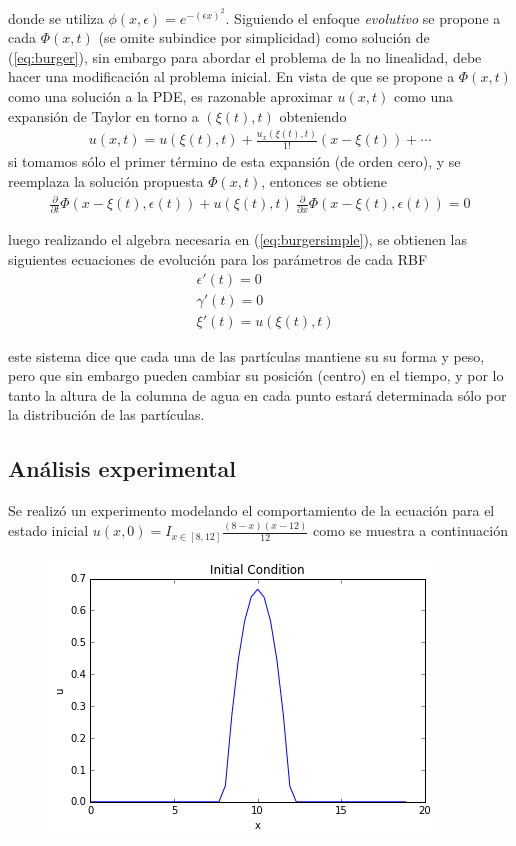 \documentclass[spanish]{article}
\begin{document}
    \noindent donde se utiliza $\displaystyle \phi(x,\epsilon) = e^{-(\epsilon x)^2}$. Siguiendo el enfoque \textit{evolutivo} se propone a cada $\Phi(x,t)$ (se omite subindice por simplicidad) como solución de (\ref{eq:burger}), sin embargo para abordar el problema de la no linealidad, debe hacer una modificación al problema inicial. En vista de que se propone a $\Phi(x,t)$ como una solución a la PDE, es razonable aproximar $u(x,t)$ como una expansión de Taylor en torno a $(\xi(t),t)$ obteniendo
    \begin{align}
      u(x,t) = u(\xi(t),t) + \frac{u_x(\xi(t),t)}{1!}(x-\xi(t)) + \cdots
    \end{align}
    si tomamos sólo el primer término de esta expansión (de orden cero), y  se reemplaza la solución propuesta $\Phi(x,t)$, entonces se obtiene
    \begin{align}
      \frac{\partial}{\partial t}\Phi(x-\xi(t),\epsilon(t)) + u(\xi(t),t)\ \frac{\partial}{\partial x}\Phi(x-\xi(t),\epsilon(t)) = 0
      \label{eq:burgersimple}
    \end{align}

    \noindent luego realizando el algebra necesaria en (\ref{eq:burgersimple}), se obtienen las siguientes ecuaciones de evolución para los parámetros de cada RBF
    \begin{align*}
    & \epsilon'(t) = 0 \\
    & \gamma'(t) = 0  \\
    & \xi'(t) = u(\xi(t),t) 
    \end{align*}
   
    \noindent este sistema dice que cada una de las partículas mantiene su su forma y peso, pero que sin embargo pueden cambiar su posición (centro) en el tiempo, y por lo tanto la altura de la columna de agua en cada punto estará determinada sólo por la distribución de las partículas.


    \subsection{Análisis experimental}
    Se realizó un experimento modelando el comportamiento de la ecuación para el estado inicial $u(x,0) = I_{x \in [8,12]}\frac{(8-x)(x-12)}{12}$ como se muestra a continuación

    \begin{figure}[H]
    	\centering
    	\includegraphics[scale=0.6]{initialu.png}
    \end{figure}
    
\end{document}
